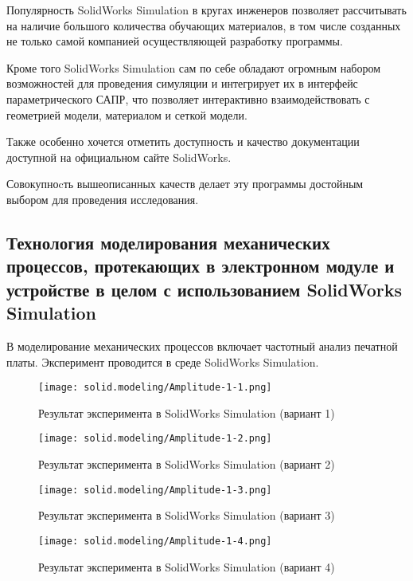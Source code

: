 Популярность SolidWorks Simulation в кругах инженеров позволяет
рассчитывать на наличие большого количества обучающих материалов, в
том числе созданных не только самой компанией осуществляющей
разработку программы.

Кроме того SolidWorks Simulation сам по себе обладают огромным набором
возможностей для проведения симуляции и интегрирует их в интерфейс
параметрического САПР, что позволяет интерактивно взаимодействовать с
геометрией модели, материалом и сеткой модели.

Также особенно хочется отметить доступность и качество документации
доступной на официальном сайте SolidWorks.

Совокупноcть вышеописанных качеств делает эту программы достойным
выбором для проведения исследования.

\subsection{Технология моделирования механических процессов,
протекающих в электронном модуле и устройстве в целом с
использованием  SolidWorks Simulation}

В моделирование механических процессов включает частотный анализ
печатной платы. Эксперимент проводится в среде SolidWorks Simulation.

\begin{figure}[H]
  \centering
  \texttt{[image: solid.modeling/Amplitude-1-1.png]} %
  \caption{Результат эксперимента в SolidWorks Simulation (вариант 1)}
\end{figure}

\begin{figure}[H]
  \centering
  \texttt{[image: solid.modeling/Amplitude-1-2.png]} %
  \caption{Результат эксперимента в SolidWorks Simulation (вариант 2)}
\end{figure}

\begin{figure}[H]
  \centering
  \texttt{[image: solid.modeling/Amplitude-1-3.png]} %
  \caption{Результат эксперимента в SolidWorks Simulation (вариант 3)}
\end{figure}

\begin{figure}[H]
  \centering
  \texttt{[image: solid.modeling/Amplitude-1-4.png]} %
  \caption{Результат эксперимента в SolidWorks Simulation (вариант 4)}
\end{figure}


